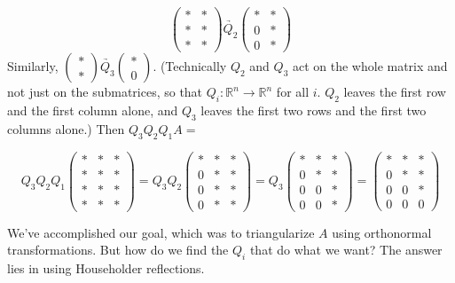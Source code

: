 \begin{equation*}
\begin{pmatrix}
* & * \\
* & * \\
* & *
\end{pmatrix}
\underrightarrow{Q_2}
\begin{pmatrix}
* & * \\
0 & * \\
0 & *
\end{pmatrix}
\end{equation*}
Similarly, $ \begin{pmatrix} * \\ * \end{pmatrix} \underrightarrow{Q_3} \begin{pmatrix} * \\ 0 \end{pmatrix} $.
(Technically $Q_2$ and $Q_3$ act on the whole matrix and not just on the submatrices, so that $Q_i: \mathbb{R}^n \rightarrow \mathbb{R}^n$ for all $i$.
$Q_2$ leaves the first row and the first column alone, and $Q_3$ leaves the first two rows and the first two columns alone.)
Then $Q_3 Q_2 Q_1 A =$

\begin{equation*}
Q_3 Q_2 Q_1
\begin{pmatrix}
* & * & * \\
* & * & * \\
* & * & * \\
* & * & *
\end{pmatrix}
= Q_3 Q_2
\begin{pmatrix}
* & * & * \\
0 & * & * \\
0 & * & * \\
0 & * & *
\end{pmatrix}
= Q_3
\begin{pmatrix}
* & * & * \\
0 & * & * \\
0 & 0 & * \\
0 & 0 & *
\end{pmatrix}
=
\begin{pmatrix}
* & * & * \\
0 & * & * \\
0 & 0 & * \\
0 & 0 & 0
\end{pmatrix}
\end{equation*}

We've accomplished our goal, which was to triangularize $A$ using orthonormal transformations.
But how do we find the $Q_i$ that do what we want? The answer lies in using Householder reflections.

